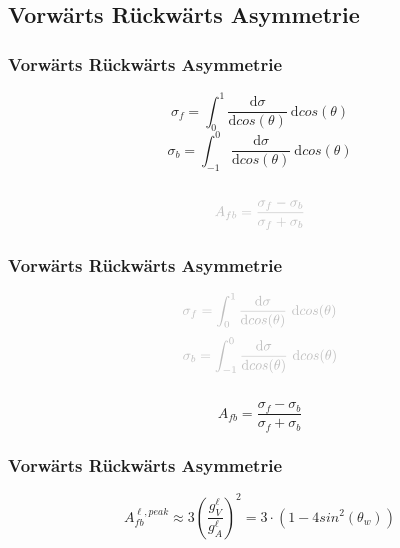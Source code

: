 \subsection{Vorwärts Rückwärts Asymmetrie}
\begin{frame}
	\frametitle{Vorwärts Rückwärts Asymmetrie}
	\begin{center}
		\begin{equation*}
		\sigma_f=\int_{0}^{1}\frac{\text{d}\sigma}{\text{d}cos(\theta)}~\text{d}cos(\theta)
		\end{equation*}
		\begin{equation*}
		\sigma_b=\int_{-1}^{0}\frac{\text{d}\sigma}{\text{d}cos(\theta)}~\text{d}cos(\theta)
		\end{equation*}
		\\
		\begin{equation*}
		\textcolor{lightgray}{A_{fb}=\frac{\sigma_f-\sigma_b}{\sigma_f+\sigma_b}}
		\end{equation*}
	\end{center}
\end{frame}
\begin{frame}
	\frametitle{Vorwärts Rückwärts Asymmetrie}
	\begin{center}
		\begin{equation*}
		\textcolor{lightgray}{\sigma_f=\int_{0}^{1}\frac{\text{d}\sigma}{\text{d}cos(\theta)}~\text{d}cos(\theta)}
		\end{equation*}
		\begin{equation*}
		\textcolor{lightgray}{\sigma_b=\int_{-1}^{0}\frac{\text{d}\sigma}{\text{d}cos(\theta)}~\text{d}cos(\theta)}
		\end{equation*}
		\\
		\begin{equation*}
		A_{fb}=\frac{\sigma_f-\sigma_b}{\sigma_f+\sigma_b}
		\end{equation*}
	\end{center}
\end{frame}
\begin{frame}
	\frametitle{Vorwärts Rückwärts Asymmetrie}
	\begin{center}
		\begin{equation*}
		A_{fb}^{\ell,peak}\approx 3 \left ( \frac{g^{\ell}_V}{g^{\ell}_A} \right )^2=3\cdot (1-4 sin^2(\theta_w))
		\end{equation*}
	\end{center}
\end{frame}
